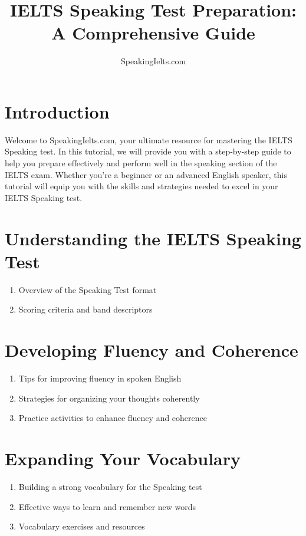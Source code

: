 \documentclass{article}
\title{IELTS Speaking Test Preparation: A Comprehensive Guide}
\author{SpeakingIelts.com}
\begin{document}
\maketitle

\section{Introduction}
Welcome to SpeakingIelts.com, your ultimate resource for mastering the IELTS Speaking test. In this tutorial, we will provide you with a step-by-step guide to help you prepare effectively and perform well in the speaking section of the IELTS exam. Whether you're a beginner or an advanced English speaker, this tutorial will equip you with the skills and strategies needed to excel in your IELTS Speaking test.

\section{Understanding the IELTS Speaking Test}
\begin{enumerate}[label=\alph*)]
    \item Overview of the Speaking Test format
    \item Scoring criteria and band descriptors
\end{enumerate}

\section{Developing Fluency and Coherence}
\begin{enumerate}[label=\alph*)]
    \item Tips for improving fluency in spoken English
    \item Strategies for organizing your thoughts coherently
    \item Practice activities to enhance fluency and coherence
\end{enumerate}

\section{Expanding Your Vocabulary}
\begin{enumerate}[label=\alph*)]
    \item Building a strong vocabulary for the Speaking test
    \item Effective ways to learn and remember new words
    \item Vocabulary exercises and resources
\end{enumerate}
\end{document}
